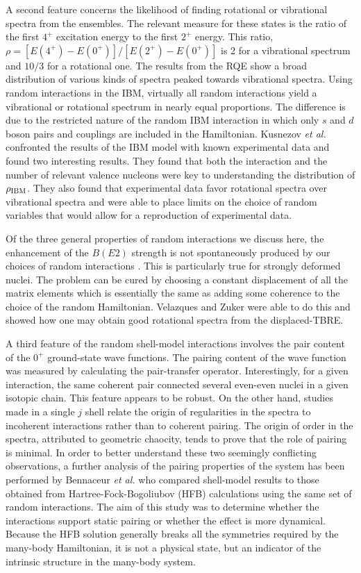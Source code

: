 \documentclass[rmp,preprint,aps,floatfix]{revtex4}
\begin{document}
A second feature concerns the likelihood of finding rotational or vibrational
spectra from the ensembles. The relevant measure for these states is the
ratio of the first $4^+$ excitation energy to the first $2^+$ energy. This
ratio, $\rho=[E(4^+)-E(0^+)]/[E(2^+)-E(0^+)]$ 
is 2 for a vibrational spectrum and $10/3$ for
a rotational one. The results from the RQE show a broad distribution
of various kinds of spectra peaked towards vibrational spectra.  
Using random interactions in the IBM,
virtually all random interactions yield a vibrational or rotational spectrum
in nearly equal proportions.  
The difference is due to the restricted nature of the random IBM interaction 
in which only $s$ and $d$ boson pairs and couplings are included in the 
Hamiltonian.  Kusnezov {\em et al.} \cite{kzc00} confronted the 
results of the IBM model with known experimental data 
and found two interesting results. They found
that both the interaction and the number of relevant valence nucleons
were key to understanding the distribution of $\rho_{\rm IBM}$. They also
found that experimental data favor rotational spectra over vibrational
spectra and were able to place limits on the choice of random variables
that would allow for a reproduction of experimental data. 

Of the three general properties of random interactions we discuss here, 
the enhancement of the $B(E2)$ strength is not spontaneously produced by
our choices of random interactions \cite{horoi01}. This is particularly
true for strongly deformed nuclei. 
The problem can be cured \cite{vz02} by
choosing a constant displacement of all the matrix elements which is 
essentially the same as adding some coherence to the choice of the random
Hamiltonian. Velazques and Zuker \cite{vz02} were able to do this and 
showed how one may obtain good rotational spectra from the displaced-TBRE. 

A third feature of the random shell-model interactions involves the pair 
content of the $0^+$ ground-state wave functions. The pairing content of
the wave function was measured by calculating the pair-transfer operator. 
Interestingly, for a given interaction, the same coherent pair connected
several even-even nuclei in a given isotopic chain. This feature appears
to be robust.  On the other hand, studies \cite{mulhall00} 
made in a single $j$ shell relate the origin of regularities in 
the spectra to incoherent interactions
rather than to coherent pairing. The origin of order in the spectra,
attributed to geometric chaocity,
tends to prove that the role of pairing is minimal.
In order to better understand these two seemingly conflicting
observations, a further analysis of the pairing properties of 
the system has been performed by Bennaceur {\em et al.} \cite{ben02}
who compared shell-model results to those obtained 
from Hartree-Fock-Bogoliubov (HFB) calculations using the same set of
random interactions. 
The aim of this study was to determine whether
the interactions support static pairing or whether the effect is 
more dynamical.  Because the HFB solution generally breaks all the 
symmetries required by the many-body Hamiltonian, it is not a 
physical state, but an indicator of the intrinsic structure in 
the many-body system.  
\end{document}
